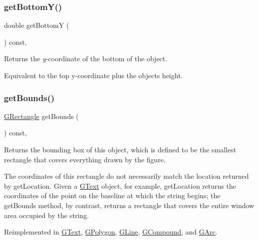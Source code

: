 \subsubsection{\texorpdfstring{get\+Bottom\+Y()}{getBottomY()}}
{\footnotesize\ttfamily double get\+BottomY (\begin{DoxyParamCaption}{ }\end{DoxyParamCaption}) const\hspace{0.3cm}{\ttfamily [virtual]}, {\ttfamily [inherited]}}



Returns the {\itshape y}-\/coordinate of the bottom of the object. 

Equivalent to the top y-\/coordinate plus the object\textquotesingle{}s height. \mbox{\label{classsgl_1_1GObject_a29e6ac35a0b48f491a4c88194cc5da3b}} 
\subsubsection{\texorpdfstring{get\+Bounds()}{getBounds()}}
{\footnotesize\ttfamily \mbox{\hyperlink{structsgl_1_1GRectangle}{G\+Rectangle}} get\+Bounds (\begin{DoxyParamCaption}{ }\end{DoxyParamCaption}) const\hspace{0.3cm}{\ttfamily [virtual]}, {\ttfamily [inherited]}}



Returns the bounding box of this object, which is defined to be the smallest rectangle that covers everything drawn by the figure. 

The coordinates of this rectangle do not necessarily match the location returned by {\ttfamily get\+Location}. Given a {\ttfamily \mbox{\hyperlink{classsgl_1_1GText}{G\+Text}}} object, for example, {\ttfamily get\+Location} returns the coordinates of the point on the baseline at which the string begins; the {\ttfamily get\+Bounds} method, by contrast, returns a rectangle that covers the entire window area occupied by the string. 

Reimplemented in \mbox{\hyperlink{classsgl_1_1GText_a89040ce9277825772d359fccd33bca86}{G\+Text}}, \mbox{\hyperlink{classsgl_1_1GPolygon_a89040ce9277825772d359fccd33bca86}{G\+Polygon}}, \mbox{\hyperlink{classsgl_1_1GLine_a89040ce9277825772d359fccd33bca86}{G\+Line}}, \mbox{\hyperlink{classsgl_1_1GCompound_a89040ce9277825772d359fccd33bca86}{G\+Compound}}, and \mbox{\hyperlink{classsgl_1_1GArc_a89040ce9277825772d359fccd33bca86}{G\+Arc}}.

